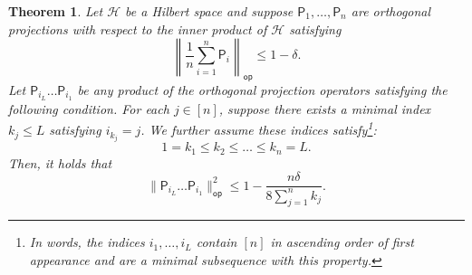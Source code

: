 \documentclass[10pt,a4paper]{amsart}
\newtheorem{theorem}{Theorem}[section]
\begin{document}
\begin{theorem}
\label{thm:gen_gap}
        Let $\mathcal{H}$ be a Hilbert space and suppose $\mathsf{P}_1,\ldots, \mathsf{P}_n$ are orthogonal projections with respect to the inner product of $\mathcal{H}$ satisfying
        \begin{equation}
    \left\|\frac{1}{n}\sum_{i=1}^n \mathsf{P}_i\right\|_{\mathsf{op}}\leq 1-\delta.
\end{equation} 
Let $\mathsf{P}_{i_L}\ldots \mathsf{P}_{i_1}$ be any product of the orthogonal projection operators satisfying the following condition. For each $j\in [n]$, suppose there exists a minimal index $k_j\leq L$ satisfying $i_{k_j}=j$. We further assume these indices satisfy\footnote{In words, the indices $i_1,\ldots,i_L$ contain $[n]$ in ascending order of first appearance and are a minimal subsequence with this property.}:
\begin{equation}
\label{eq:order}
        1=k_1\leq k_2\leq\ldots\leq k_n=L.
\end{equation}
Then, it holds that
\begin{equation*}
    \|\mathsf{P}_{i_L}\ldots \mathsf{P}_{i_1}\|_{\mathsf{op}}^2\leq 1-\frac{n\delta}{8\sum_{j=1}^n k_j}.
\end{equation*}
\end{theorem}
\end{document}
